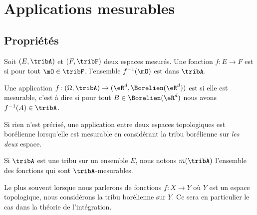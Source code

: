 
\section{Applications mesurables}

\subsection{Propriétés}

\begin{definition} \label{DefQKjDSeC}
    Soit \( (E,\tribA)\) et \( (F,\tribF)\) deux espaces mesurés. Une fonction \( f\colon E\to F\) est  si pour tout \( \mO\in \tribF\), l'ensemble \( f^{-1}(\mO)\) est dans \( \tribA\).
\end{definition}

\begin{definition}     \label{DefHHIBooNrpQjs}
    Une application \( f\colon (\Omega,\tribA)\to (\eR^d,\Borelien(\eR^d))\) est  si elle est mesurable, c'est à dire si pour tout \( B\in\Borelien(\eR^d)\) nous avons \( f^{-1}(A)\in\tribA\).

    Si rien n'est précisé, une application entre deux espaces topologiques est borélienne lorsqu'elle est mesurable en considérant la tribu borélienne sur \emph{les deux} espace.
\end{definition}
Si \( \tribA\) est une tribu sur un ensemble \( E\), nous notons \( m(\tribA)\) l'ensemble des fonctions qui sont \( \tribA\)-mesurables.

Le plus souvent lorsque nous parlerons de fonctions \( f\colon X\to Y\) où \( Y\) est un espace topologique, nous considérons la tribu borélienne sur \( Y\). Ce sera en particulier le cas dans la théorie de l'intégration.

